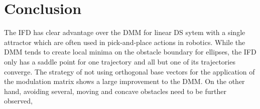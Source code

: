 \section{Conclusion}
The IFD has clear advantage over the DMM for linear DS sytem with a single attractor which are often used in pick-and-place actions in robotics. While the DMM tends to create local minima on the obstacle boundary for ellipses, the IFD only has a saddle point for one trajectory and all but one of its trajectories converge. The strategy of not using orthogonal base vectors for the application of the modulation matrix shows a large improvement to the DMM. On the other hand, avoiding several, moving and concave obstacles need to be further observed,

